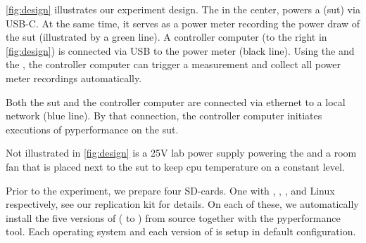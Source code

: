 \autoref{fig:design} illustrates our experiment design.
The  in the center, powers a  (\gls{sut}) via USB-C.
At the same time, it serves as a power meter recording the power draw of the \gls{sut} (illustrated by a green line).
A controller computer (to the right in \autoref{fig:design}) is connected via USB to the power meter (black line).
Using the 
and the 
, the controller computer can trigger a measurement and collect all power meter recordings automatically.

Both the \gls{sut} and the controller computer are connected via ethernet to a local network (blue line).
By that connection, the controller computer initiates executions of \acrlong{pyperformance} on the \gls{sut}.

Not illustrated in \autoref{fig:design} is a 25V lab power supply powering the  and a room fan that is placed next to the \gls{sut} to keep \gls{cpu} temperature on a constant level.

Prior to the experiment, we prepare four SD-cards.
One with , , , and  Linux respectively, see our replication kit for details.
On each of these, we automatically install the five versions of \python ( to ) from source together with the \gls{pyperformance} tool.
Each operating system and each version of \python is setup in default configuration.






